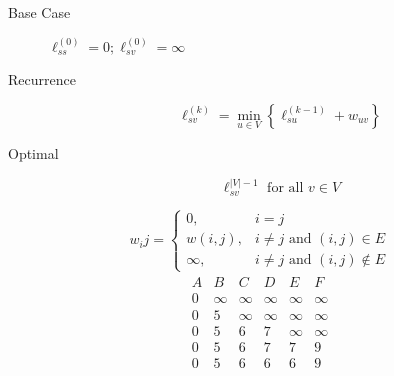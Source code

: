 \documentclass{article}
\begin{document}
\begin{multicols*}{2}
    \begin{multicols*}{2}
        \begin{description}
            \item[Base Case] \(\ell_{ss}^{(0)} = 0; \ell_{sv}^{(0)} = \infty\)
            \item[Recurrence] \[\ell_{sv}^{(k)} = \min_{u \in V} \left\{ \ell_{su}^{(k-1)} + w_{uv} \right\}\]
            \item[Optimal] \[\ell_{sv}^{|V|-1} \text{ for all } v \in V\]
        \end{description}
        \begin{equation*}
            w_ij = \begin{cases}
                0,       & i = j                                 \\
                w(i, j), & i \neq j \text{ and } (i, j) \in E    \\
                \infty,  & i \neq j \text{ and } (i, j) \notin E
            \end{cases}
        \end{equation*}
        \begin{align*}
            \begin{array}{|c|c|c|c|c|c|}
                \hline
                A & B      & C      & D      & E      & F      \\
                \hline
                0 & \infty & \infty & \infty & \infty & \infty \\
                \hline
                0 & 5      & \infty & \infty & \infty & \infty \\
                \hline
                0 & 5      & 6      & 7      & \infty & \infty \\
                \hline
                0 & 5      & 6      & 7      & 7      & 9      \\
                \hline
                0 & 5      & 6      & 6      & 6      & 9      \\

\end{array}
\end{align*}
\end{multicols*}
\end{multicols*}
\end{document}
